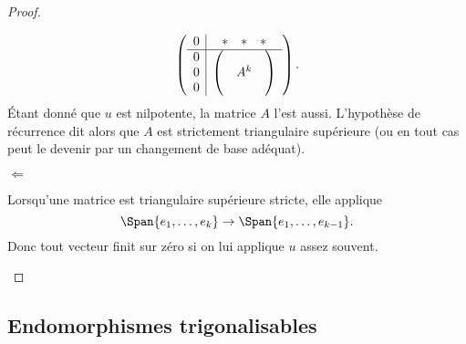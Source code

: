 \begin{proof}
\begin{subproof}
\begin{equation}
               \begin{pmatrix}
                       \begin{array}[]{c|c}
                           0&\begin{matrix} 
                               * &   *    &   *    
                           \end{matrix}\\
                           \hline
                           \begin{matrix}
                               0 \\ 
                               0 \\ 
                               0 
                           \end{matrix}&
                           \begin{pmatrix}
                                &       &       \\
                                &   A^k    &       \\
                                &       &   
                           \end{pmatrix}
                       \end{array}
               \end{pmatrix}.
           \end{equation}
           Étant donné que \( u\) est nilpotente, la matrice \( A\) l'est aussi. L'hypothèse de récurrence dit alors que \( A\) est strictement triangulaire supérieure (ou en tout cas peut le devenir par un changement de base adéquat).

       \item[\( \Leftarrow\)]

            Lorsqu'une matrice est triangulaire supérieure stricte, elle applique
            \begin{equation}
                \Span\{ e_1,\ldots, e_k \}\to\Span\{ e_1,\ldots, e_{k-1} \}.
            \end{equation}
            Donc tout vecteur finit sur zéro si on lui applique \( u\) assez souvent.
    \end{subproof}
\end{proof}

\subsection{Endomorphismes trigonalisables}

